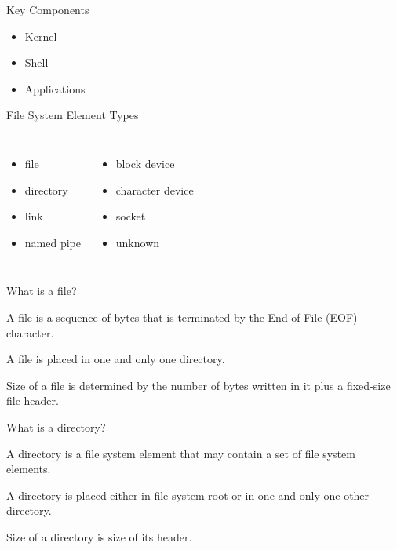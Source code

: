 \documentclass[compress]{beamer}
\begin{document}
\begin{slide}
	\begin{block}{Key Components}

	\begin{itemize}
	\item[] Kernel
	\item[] Shell
	\item[] Applications
	\end{itemize}

	\end{block}
\end{slide}

\begin{slide}
	\begin{block}{File System Element Types}

	\begin{columns}
		\begin{itemize}
		\item[] file
		\item[] directory
		\item[] link
		\item[] named pipe
		\end{itemize}
		\begin{itemize}
		\item[] block device
		\item[] character device
		\item[] socket
		\item[] unknown
		\end{itemize}
	\end{columns}

	\end{block}
\end{slide}

\begin{slide}
	\begin{block}{What is a file?}

	A file is a sequence of bytes that is terminated by the End of File (EOF) character.

	A file is placed in one and only one directory.

	Size of a file is determined by the number of bytes written in it plus a fixed-size file header.

	\end{block}
\end{slide}

\begin{slide}
	\begin{block}{What is a directory?}

	A directory is a file system element that may contain a set of file system elements.

	A directory is placed either in file system root or in one and only one other directory.

	Size of a directory is size of its header.

	\end{block}
\end{slide}
\end{document}
